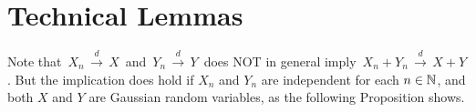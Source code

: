 

\section{Technical Lemmas}
\setcounter{theorem}{0}
\setcounter{equation}{0}

\renewcommand{\theenumi}{\roman{enumi}}
\renewcommand{\labelenumi}{\textnormal{(\theenumi)}$\;\;$}

Note that
\,$X_{n}\,\overset{d}{\longrightarrow}\,X$\,
and
\,$Y_{n}\,\overset{d}{\longrightarrow}\,Y$\,
does NOT in general imply
\,$X_{n} + Y_{n}\,\overset{d}{\longrightarrow}\,X + Y$.
But the implication does hold if $X_{n}$ and $Y_{n}$
are independent for each $n \in \mathbb{N}$, and 
both $X$ and $Y$ are Gaussian random variables,
as the following Proposition shows.

